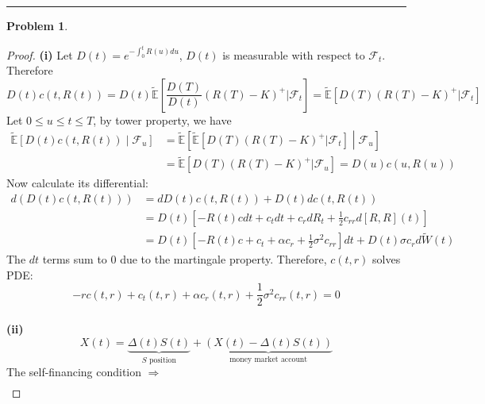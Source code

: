 \documentclass[a4paper, 10pt]{article}
\theoremstyle{definition}
\newtheorem{problem}{Problem}
\theoremstyle{hSol}
\begin{document}
\noindent\rule{16cm}{0.4pt}
\begin{problem} 
\end{problem}
\begin{proof} \textbf{(i)} Let $D(t)= e^{-\int_0^t R(u)du}$, $D(t)$ is measurable with respect to $\mathcal{F}_t$. Therefore
\begin{equation}
  D(t)c(t,R(t)) = D(t)\widetilde{\mathbb{E}}\left[\frac{D(T)}{D(t)} (R(T)-K)^+ \Big| \mathcal{F}_t\right] = \widetilde{\mathbb{E}}\left[D(T) (R(T)-K)^+ \Big| \mathcal{F}_t\right]
\end{equation}
Let $0\leq u \leq t \leq T$, by tower property, we have
\begin{equation}
  \begin{split}
    \widetilde{\mathbb{E}}\left[D(t)c(t,R(t))\middle|\mathcal{F}_u\right] &= \widetilde{\mathbb{E}}\left[\widetilde{\mathbb{E}}\left[D(T) (R(T)-K)^+ \Big| \mathcal{F}_t\right]\middle|\mathcal{F}_u\right]\\ 
    &= \widetilde{\mathbb{E}}\left[D(T) (R(T)-K)^+ \Big| \mathcal{F}_u\right] = D(u)c(u,R(u))
  \end{split}
\end{equation}
Now calculate its differential:
\begin{equation}
  \begin{split}
    d(D(t)c(t,R(t))) &= dD(t)c(t,R(t)) + D(t)d c(t,R(t)) \\
    &=D(t) \left[  -R(t)cdt + c_tdt + c_r dR_t + \frac{1}{2}c_{rr}d[R,R](t)\right]\\
    &=D(t) \left[  -R(t)c + c_t + \alpha c_r + \frac{1}{2}\sigma^2 c_{rr}\right]dt + D(t)\sigma c_r d\widetilde{W}(t)
  \end{split}
\end{equation}
The $dt$ terms sum to $0$ due to the martingale property. Therefore, $c(t,r)$ solves PDE:
\begin{equation}
  -rc(t,r) + c_t(t,r) + \alpha c_r(t,r) + \frac{1}{2}\sigma^2 c_{rr}(t,r) = 0
\end{equation}
~\\
\textbf{(ii)} 
\begin{equation}
  X(t) = \underbrace{\Delta(t)S(t)}_{S \text{ position}} + \underbrace{(X(t) - \Delta(t)S(t))}_{\text{money market account}}
\end{equation}
The self-financing condition $\Rightarrow$
\begin{equation}
  \begin{split}

\end{split}
\end{equation}
\end{proof}
\end{document}
